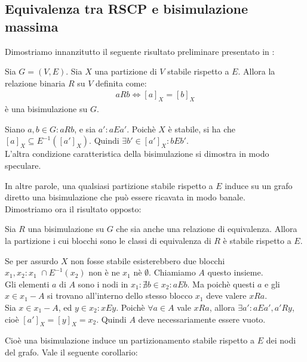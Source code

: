 \subsection{Equivalenza tra RSCP e bisimulazione massima}
Dimostriamo innanzitutto il seguente risultato preliminare presentato in \cite{gentilini}:
\begin{proposition}
    Sia $G = (V,E)$. Sia $X$ una partizione di $V$ stabile rispetto a $E$. Allora la relazione binaria $R$ su $V$ definita come:
    \begin{gather*}
        a R b \iff [a]_X = [b]_X
    \end{gather*}
    è una bisimulazione su $G$.
    \label{prop:part_induce_bisi}
\end{proposition}
\begin{proof2}
    Siano $a,b \in G : a R b$, e sia $a' : a E a'$. Poichè $X$ è stabile, si ha che $[a]_X \subseteq E^{-1}([a']_X)$. Quindi $\exists b' \in [a']_X : b E b'$.\\
    L'altra condizione caratteristica della bisimulazione si dimostra in modo speculare.
\end{proof2}
In altre parole, una qualsiasi partizione stabile rispetto a $E$ induce su un grafo diretto una bisimulazione che può essere ricavata in modo banale.\\
Dimostriamo ora il risultato opposto:
\begin{proposition}
    Sia $R$ una bisimulazione su $G$ che sia anche una relazione di equivalenza. Allora la partizione i cui blocchi sono le classi di equivalenza di $R$ è stabile rispetto a $E$.
    \label{prop:bisi_induce_part}
\end{proposition}
\begin{proof2}
    Se per assurdo $X$ non fosse stabile esisterebbero due blocchi $x_1, x_2 : x_1 \,\,\cap E^{-1}(x_2)$ non è ne $x_1$ nè $\emptyset$. Chiamiamo $A$ questo insieme.\\
    Gli elementi $a$ di $A$ sono i nodi in $x_1 : \nexists b \in x_2 : a E b$. Ma poichè questi $a$ e gli $x \in x_1 - A$ si trovano all'interno dello stesso blocco $x_1$ deve valere $x R a$.\\
    Sia $x \in x_1 - A$, ed $y \in x_2 : x E y$. Poichè $\forall a \in A$ vale $x R a$, allora $\exists a' : a E a', a' R y$, cioè $[a']_X = [y]_X = x_2$. Quindi $A$ deve necessariamente essere vuoto.
\end{proof2}
Cioè una bisimulazione induce un partizionamento stabile rispetto a $E$ dei nodi del grafo. Vale il seguente corollario:
